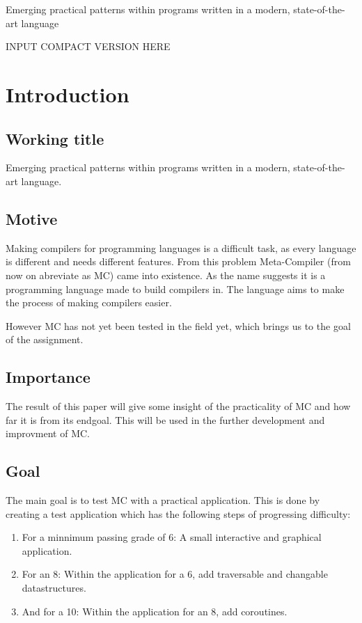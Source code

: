 

Emerging practical patterns within programs written in a modern, state-of-the-art language

INPUT COMPACT VERSION HERE



\chapter{Introduction}
\section{Working title}
Emerging practical patterns within programs written in a modern, state-of-the-art language.
\section{Motive}
Making compilers for programming languages is a difficult task, as every language is different and needs different features.
From this problem Meta-Compiler (from now on abreviate as MC) came into existence.
As the name suggests it is a programming language made to build compilers in.
The language aims to make the process of making compilers easier.

However MC has not yet been tested in the field yet, which brings us to the goal of the assignment.

\section{Importance}
The result of this paper will give some insight of the practicality of MC and how far it is from its endgoal.
This will be used in the further development and improvment of MC.

\section{Goal}\label{sec:goalsmandate}
The main goal is to test MC with a practical application.
This is done by creating a test application which has the following steps of progressing difficulty:

\begin{enumerate}
   \item For a minnimum passing grade of 6: \newline
      A small interactive and graphical application.
   \item For an 8: \newline
      Within the application for a 6, add traversable and changable datastructures.
   \item And for a 10: \newline
      Within the application for an 8, add coroutines.
\end{enumerate}

